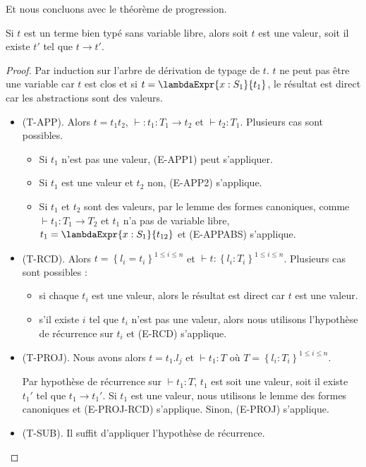 Et nous concluons avec le théorème de progression.

\begin{theorem} [de progression] 
  Si $t$ est un terme bien typé sans variable libre, alors soit $t$ est une
  valeur, soit il existe $t'$ tel que $t \rightarrow t'$.
\end{theorem}

\begin{proof}
  Par induction sur l'arbre de dérivation de typage de $t$.
  $t$ ne peut pas être une variable car $t$ est clos et si $t = \lambdaExpr{x :
    S_{1}}{t_{1}}$, le résultat est direct car les abstractions sont des valeurs.
  \begin{itemize}
  \item (T-APP). Alors $t = t_{1}t_{2}$, $\vdash : t_{1} : T_{1} \rightarrow
    t_{2}$ et $\vdash t_{2} : T_{1}$. Plusieurs cas sont possibles.
    \begin{itemize}
    \item Si $t_{1}$ n'est pas une valeur, (E-APP1) peut s'appliquer.
    \item Si $t_{1}$ est une valeur et $t_{2}$ non, (E-APP2) s'applique.
    \item Si $t_{1}$ et $t_{2}$ sont des valeurs, par le lemme des formes
      canoniques, comme $\vdash t_{1} : T_{1} \rightarrow T_{2}$ et $t_{1}$ n'a
      pas de variable libre, $t_{1} = \lambdaExpr{x : S_{1}}{t_{12}}$ et (E-APPABS) s'applique.
    \end{itemize}
  \item (T-RCD). Alors $t = \left\{ l_{i} = t_{i} \right\}^{1 \leq i \leq n}$ et
    $\vdash t : \left\{ l_{i} : T_{i} \right\}^{1 \leq i \leq n}$. Plusieurs cas
    sont possibles :
    \begin{itemize}
    \item si chaque $t_{i}$ est une valeur, alors le résultat est direct car $t$
      est une valeur.
    \item s'il existe $i$ tel que $t_{i}$ n'est pas une valeur, alors nous
      utilisons l'hypothèse de récurrence sur $t_{i}$ et (E-RCD) s'applique.
    \end{itemize}
  \item (T-PROJ). Nous avons alors
    $t = t_{1}.l_{j}$ et $\vdash t_{1} : T$ où $T = \left\{ l_{i} : T_{i}
    \right\}^{1 \leq i \leq n}$.

  Par hypothèse de récurrence sur $\vdash t_{1} : T$, $t_{1}$ est soit une
  valeur, soit il existe $t_{1}'$ tel que $t_{1} \rightarrow t_{1}'$. Si $t_{1}$
  est une valeur, nous utilisons le lemme
  des formes canoniques
  et (E-PROJ-RCD) s'applique. Sinon, (E-PROJ) s'applique.
  \item (T-SUB). Il suffit d'appliquer l'hypothèse de récurrence.
  \end{itemize}
\end{proof}


